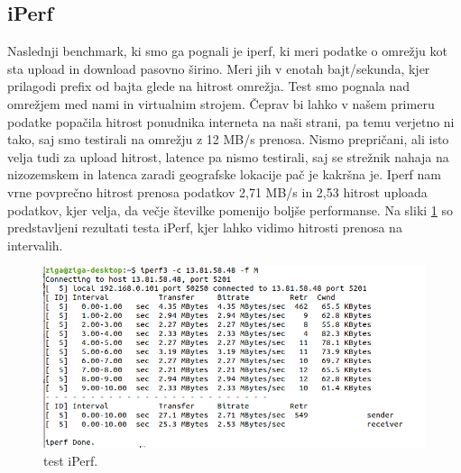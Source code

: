 \subsection{iPerf}
Naslednji benchmark, ki smo ga pognali je iperf, ki meri podatke o omrežju kot sta upload in download pasovno širino. Meri jih v enotah bajt/sekunda, kjer prilagodi prefix od bajta glede na hitrost omrežja. Test smo pognala nad omrežjem med nami in virtualnim strojem. Čeprav bi lahko v našem primeru podatke popačila hitrost ponudnika interneta na naši strani, pa temu verjetno ni tako, saj smo testirali na omrežju z 12 MB/s prenosa. Nismo prepričani, ali isto velja tudi za upload hitrost, latence pa nismo testirali, saj se strežnik nahaja na nizozemskem in latenca zaradi geografske lokacije pač je kakršna je. Iperf nam vrne povprečno hitrost prenosa podatkov 2,71 MB/s in 2,53 hitrost uploada podatkov, kjer velja, da večje številke pomenijo boljše performanse. Na sliki \ref{fig:3_4_iperf1} so predstavljeni rezultati testa iPerf, kjer lahko vidimo hitrosti prenosa na intervalih.
\begin{figure}[H]
    \centering
    \includegraphics[scale=0.5]{Img/3_iperf1.png}
    \caption{test iPerf.}
    \label{fig:3_4_iperf1}
\end{figure}


